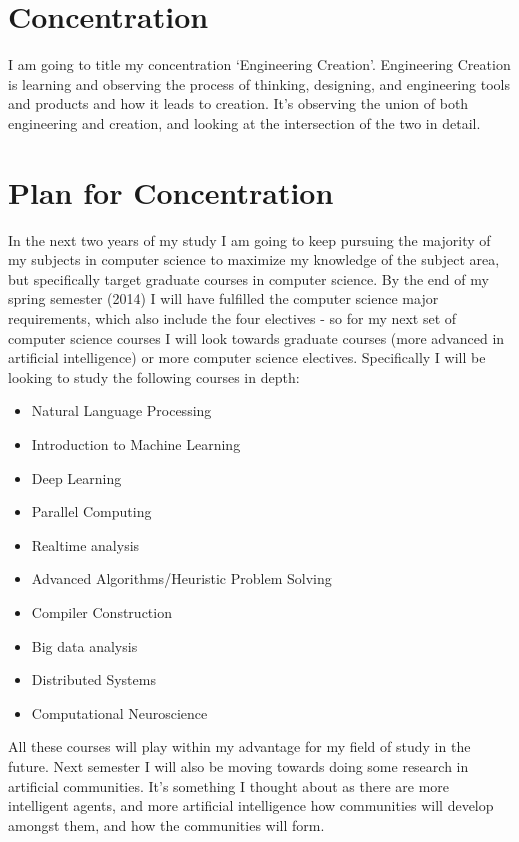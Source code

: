 \documentclass[11pt, oneside]{article}   	%
\begin{document}
\section{Concentration}

\par I am going to title my concentration `Engineering Creation'. Engineering Creation is learning and observing the process of thinking, designing, and engineering tools and products and how it leads to creation. It's observing the union of both engineering and creation, and looking at the intersection of the two in detail.

\section{Plan for Concentration}

\par In the next two years of my study I am going to keep pursuing the majority of my subjects in computer science to maximize my knowledge of the subject area, but specifically target graduate courses in computer science. By the end of my spring semester (2014) I will have fulfilled the computer science major requirements, which also include the four electives - so for my next set of computer science courses I will look towards graduate courses (more advanced in artificial intelligence) or more computer science electives. Specifically I will be looking to study the following courses in depth:

\begin{itemize}
\item Natural Language Processing
\item Introduction to Machine Learning
\item Deep Learning
\item Parallel Computing
\item Realtime analysis
\item Advanced Algorithms/Heuristic Problem Solving 
\item Compiler Construction
\item Big data analysis
\item Distributed Systems
\item Computational Neuroscience
\end{itemize}

\par All these courses will play within my advantage for my field of study in the future. Next semester I will also be moving towards doing some research in artificial communities. It's something I thought about as there are more intelligent agents, and more artificial intelligence how communities will develop amongst them, and how the communities will form.
\end{document}
